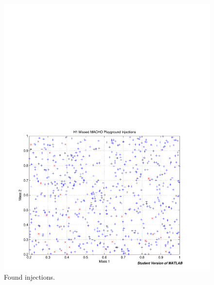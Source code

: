 \begin{figure}[p]
\begin{center}
\includegraphics[width=\textwidth]{analysis/figures/m1m2_found_missed}
\end{center}
\caption{\label{f:pipeline}%
Found injections.
}
\end{figure}

